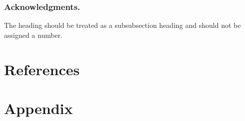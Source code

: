 \documentclass[runningheads,a4paper]{llncs}
\begin{document}
 
\subsubsection*{Acknowledgments.} The heading should be treated as a
subsubsection heading and should not be assigned a number.

\section{References}\label{references}
%



\section*{Appendix} 
\end{document}
